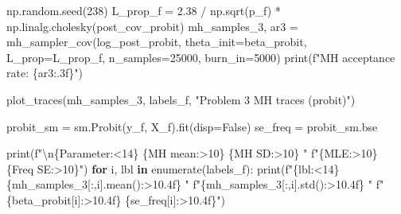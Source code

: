 \documentclass[
  letterpaper,
  DIV=11,
  numbers=noendperiod]{scrartcl}
\newenvironment{Shaded}{\begin{snugshade}}{\end{snugshade}}
\newcommand{\BuiltInTok}[1]{\textcolor[rgb]{0.00,0.23,0.31}{#1}}
\newcommand{\CharTok}[1]{\textcolor[rgb]{0.13,0.47,0.30}{#1}}
\newcommand{\ControlFlowTok}[1]{\textcolor[rgb]{0.00,0.23,0.31}{\textbf{#1}}}
\newcommand{\DecValTok}[1]{\textcolor[rgb]{0.68,0.00,0.00}{#1}}
\newcommand{\FloatTok}[1]{\textcolor[rgb]{0.68,0.00,0.00}{#1}}
\newcommand{\KeywordTok}[1]{\textcolor[rgb]{0.00,0.23,0.31}{\textbf{#1}}}
\newcommand{\NormalTok}[1]{\textcolor[rgb]{0.00,0.23,0.31}{#1}}
\newcommand{\OperatorTok}[1]{\textcolor[rgb]{0.37,0.37,0.37}{#1}}
\newcommand{\SpecialCharTok}[1]{\textcolor[rgb]{0.37,0.37,0.37}{#1}}
\newcommand{\SpecialStringTok}[1]{\textcolor[rgb]{0.13,0.47,0.30}{#1}}
\newcommand{\StringTok}[1]{\textcolor[rgb]{0.13,0.47,0.30}{#1}}
\newcommand{\VariableTok}[1]{\textcolor[rgb]{0.07,0.07,0.07}{#1}}
\begin{document}
\begin{Shaded}
\begin{Highlighting}[]
\NormalTok{np.random.seed(}\DecValTok{238}\NormalTok{)}
\NormalTok{L\_prop\_f }\OperatorTok{=} \FloatTok{2.38} \OperatorTok{/}\NormalTok{ np.sqrt(p\_f) }\OperatorTok{*}\NormalTok{ np.linalg.cholesky(post\_cov\_probit)}
\NormalTok{mh\_samples\_3, ar3 }\OperatorTok{=}\NormalTok{ mh\_sampler\_cov(log\_post\_probit, theta\_init}\OperatorTok{=}\NormalTok{beta\_probit,}
\NormalTok{                                   L\_prop}\OperatorTok{=}\NormalTok{L\_prop\_f, n\_samples}\OperatorTok{=}\DecValTok{25000}\NormalTok{, burn\_in}\OperatorTok{=}\DecValTok{5000}\NormalTok{)}
\BuiltInTok{print}\NormalTok{(}\SpecialStringTok{f"MH acceptance rate: }\SpecialCharTok{\{}\NormalTok{ar3}\SpecialCharTok{:.3f\}}\SpecialStringTok{"}\NormalTok{)}

\NormalTok{plot\_traces(mh\_samples\_3, labels\_f, }\StringTok{"Problem 3 MH traces (probit)"}\NormalTok{)}

\NormalTok{probit\_sm }\OperatorTok{=}\NormalTok{ sm.Probit(y\_f, X\_f).fit(disp}\OperatorTok{=}\VariableTok{False}\NormalTok{)}
\NormalTok{se\_freq }\OperatorTok{=}\NormalTok{ probit\_sm.bse}

\BuiltInTok{print}\NormalTok{(}\SpecialStringTok{f"}\CharTok{\textbackslash{}n}\SpecialCharTok{\{}\StringTok{\textquotesingle{}Parameter\textquotesingle{}}\SpecialCharTok{:\textless{}14\}}\SpecialStringTok{ }\SpecialCharTok{\{}\StringTok{\textquotesingle{}MH mean\textquotesingle{}}\SpecialCharTok{:\textgreater{}10\}}\SpecialStringTok{ }\SpecialCharTok{\{}\StringTok{\textquotesingle{}MH SD\textquotesingle{}}\SpecialCharTok{:\textgreater{}10\}}\SpecialStringTok{ "}
      \SpecialStringTok{f"}\SpecialCharTok{\{}\StringTok{\textquotesingle{}MLE\textquotesingle{}}\SpecialCharTok{:\textgreater{}10\}}\SpecialStringTok{ }\SpecialCharTok{\{}\StringTok{\textquotesingle{}Freq SE\textquotesingle{}}\SpecialCharTok{:\textgreater{}10\}}\SpecialStringTok{"}\NormalTok{)}
\ControlFlowTok{for}\NormalTok{ i, lbl }\KeywordTok{in} \BuiltInTok{enumerate}\NormalTok{(labels\_f):}
    \BuiltInTok{print}\NormalTok{(}\SpecialStringTok{f"}\SpecialCharTok{\{}\NormalTok{lbl}\SpecialCharTok{:\textless{}14\}}\SpecialStringTok{ }\SpecialCharTok{\{}\NormalTok{mh\_samples\_3[:,i]}\SpecialCharTok{.}\NormalTok{mean()}\SpecialCharTok{:\textgreater{}10.4f\}}\SpecialStringTok{ "}
          \SpecialStringTok{f"}\SpecialCharTok{\{}\NormalTok{mh\_samples\_3[:,i]}\SpecialCharTok{.}\NormalTok{std()}\SpecialCharTok{:\textgreater{}10.4f\}}\SpecialStringTok{ "}
          \SpecialStringTok{f"}\SpecialCharTok{\{}\NormalTok{beta\_probit[i]}\SpecialCharTok{:\textgreater{}10.4f\}}\SpecialStringTok{ }\SpecialCharTok{\{}\NormalTok{se\_freq[i]}\SpecialCharTok{:\textgreater{}10.4f\}}\SpecialStringTok{"}\NormalTok{)}
\end{Highlighting}
\end{Shaded}
\end{document}
